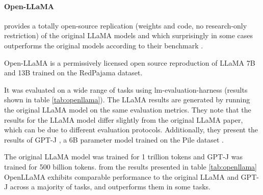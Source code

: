 \documentclass[a4paper,12pt]{article}
\begin{document}
\paragraph*{Open-LLaMA} \cite{openllama} provides a totally open-source replication (weights and code, no research-only restriction) of the original LLaMA \cite{llama} models and which surprisingly in some cases outperforms the original models according to their benchmark \cite{openllama}.

Open-LLaMA is a permissively licensed open source reproduction of LLaMA \cite{llama} 7B and 13B trained on the RedPajama \cite{redpajama} dataset. 

It was evaluated on a wide range of tasks using lm-evaluation-harness \cite{eval-harness} (results shown in table \ref*{tab:openllama}). 
The LLaMA \cite{llama} results are generated by running the original LLaMA model on the same evaluation metrics. 
They note that the results for the LLaMA model differ slightly from the original LLaMA paper, which can be due to different evaluation protocols. 
Additionally, they present the results of GPT-J \cite{gptj}, a 6B parameter model trained on the Pile dataset \cite{pile}.

The original LLaMA model was trained for 1 trillion tokens and GPT-J was trained for 500 billion tokens. from the results presented in table \ref*{tab:openllama} 
OpenLLaMA exhibits comparable performance to the original LLaMA \cite{llama} and GPT-J \cite{gptj} across a majority of tasks, and outperforms them in some tasks.
\end{document}

